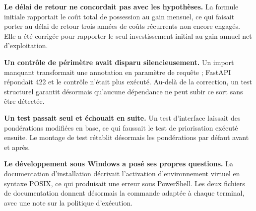 \textbf{Le délai de retour ne concordait pas avec les hypothèses.} La formule initiale
rapportait le coût total de possession au gain mensuel, ce qui faisait porter au délai
de retour trois années de coûts récurrents non encore engagés. Elle a été corrigée pour
rapporter le seul investissement initial au gain annuel net d'exploitation.

\textbf{Un contrôle de périmètre avait disparu silencieusement.} Un import manquant
transformait une annotation en paramètre de requête ; FastAPI répondait 422 et le
contrôle n'était plus exécuté. Au-delà de la correction, un test structurel garantit
désormais qu'aucune dépendance ne peut subir ce sort sans être détectée.

\textbf{Un test passait seul et échouait en suite.} Un test d'interface laissait des
pondérations modifiées en base, ce qui faussait le test de priorisation exécuté ensuite.
Le montage de test rétablit désormais les pondérations par défaut avant et après.

\textbf{Le développement sous Windows a posé ses propres questions.} La documentation
d'installation décrivait l'activation d'environnement virtuel en syntaxe POSIX, ce qui
produisait une erreur sous PowerShell. Les deux fichiers de documentation donnent
désormais la commande adaptée à chaque terminal, avec une note sur la politique
d'exécution.
